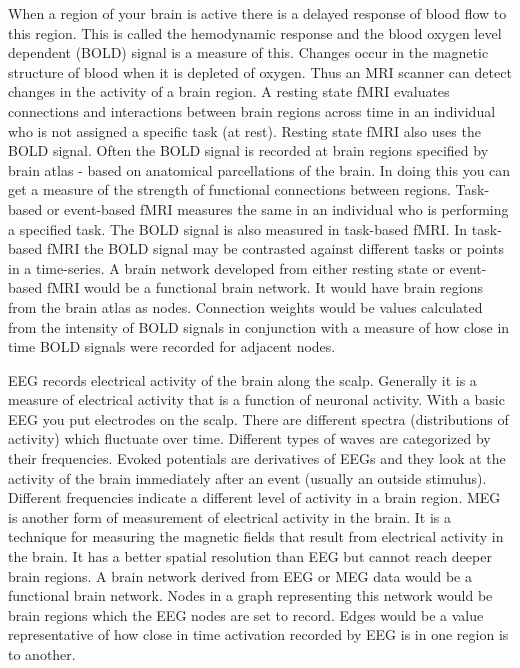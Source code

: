 	When a region of your brain is active there is a delayed response of blood flow to this region. This is called the hemodynamic response and the blood oxygen level dependent (BOLD) signal is a measure of this. Changes occur in the magnetic structure of blood when it is depleted of oxygen. Thus an MRI scanner can detect changes in the activity of a brain region.
	A resting state fMRI evaluates connections and interactions between brain regions across time in an individual who is not assigned a specific task (at rest). Resting state fMRI also uses the BOLD signal. Often the BOLD signal is recorded at brain regions specified by brain atlas - based on anatomical parcellations of the brain. In doing this you can get a measure of the strength of functional connections between regions. Task-based or event-based fMRI measures the same in an individual who is performing a specified task. The BOLD signal is also measured in task-based fMRI. In task-based fMRI the BOLD signal may be contrasted against different tasks or points in a time-series. A brain network developed from either resting state or event-based fMRI would be a functional brain network. It would have brain regions from the brain atlas as nodes. Connection weights would be values calculated from the intensity of BOLD signals in conjunction with a measure of how close in time BOLD signals were recorded for adjacent nodes. 
	
	EEG records electrical activity of the brain along the scalp. Generally it is a measure of electrical activity that is a function of neuronal activity. With a basic EEG you put electrodes on the scalp. There are different spectra (distributions of activity) which fluctuate over time. Different types of waves are categorized by their frequencies. Evoked potentials are derivatives of EEGs and they look at the activity of the brain immediately after an event (usually an outside stimulus). Different frequencies indicate a different level of activity in a brain region. MEG is another form of measurement of electrical activity in the brain. It is a technique for measuring the magnetic fields that result from electrical activity in the brain. It has a better spatial resolution than EEG but cannot reach deeper brain regions. A brain network derived from EEG or MEG data would be a functional brain network. Nodes in a graph representing this network would be brain regions which the EEG nodes are set to record. Edges would be a value representative of how close in time activation recorded by EEG is in one region is to another. 

